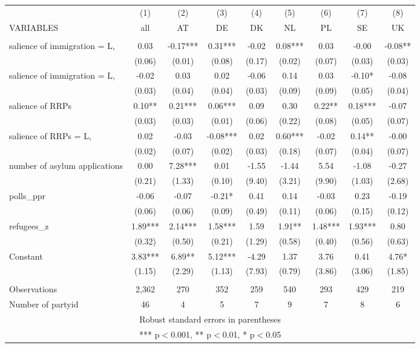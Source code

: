 \documentclass[]{article}
\begin{document}
\begin{tabular}{lcccccccc} \hline
 & (1) & (2) & (3) & (4) & (5) & (6) & (7) & (8) \\
VARIABLES & all & AT & DE & DK & NL & PL & SE & UK \\ \hline
 &  &  &  &  &  &  &  &  \\
salience of immigration = L, & 0.03 & -0.17*** & 0.31*** & -0.02 & 0.08*** & 0.03 & -0.00 & -0.08** \\
 & (0.06) & (0.01) & (0.08) & (0.17) & (0.02) & (0.07) & (0.03) & (0.03) \\
salience of immigration = L, & -0.02 & 0.03 & 0.02 & -0.06 & 0.14 & 0.03 & -0.10* & -0.08 \\
 & (0.03) & (0.04) & (0.04) & (0.03) & (0.09) & (0.09) & (0.05) & (0.04) \\
salience of RRPs & 0.10** & 0.21*** & 0.06*** & 0.09 & 0.30 & 0.22** & 0.18*** & -0.07 \\
 & (0.03) & (0.03) & (0.01) & (0.06) & (0.22) & (0.08) & (0.05) & (0.07) \\
salience of RRPs = L, & 0.02 & -0.03 & -0.08*** & 0.02 & 0.60*** & -0.02 & 0.14** & -0.00 \\
 & (0.02) & (0.07) & (0.02) & (0.03) & (0.18) & (0.07) & (0.04) & (0.07) \\
number of asylum applications & 0.00 & 7.28*** & 0.01 & -1.55 & -1.44 & 5.54 & -1.08 & -0.27 \\
 & (0.21) & (1.33) & (0.10) & (9.40) & (3.21) & (9.90) & (1.03) & (2.68) \\
polls\_ppr & -0.06 & -0.07 & -0.21* & 0.41 & 0.14 & -0.03 & 0.23 & -0.19 \\
 & (0.06) & (0.06) & (0.09) & (0.49) & (0.11) & (0.06) & (0.15) & (0.12) \\
refugees\_z & 1.89*** & 2.14*** & 1.58*** & 1.59 & 1.91** & 1.48*** & 1.93*** & 0.80 \\
 & (0.32) & (0.50) & (0.21) & (1.29) & (0.58) & (0.40) & (0.56) & (0.63) \\
Constant & 3.83*** & 6.89** & 5.12*** & -4.29 & 1.37 & 3.76 & 0.41 & 4.76* \\
 & (1.15) & (2.29) & (1.13) & (7.93) & (0.79) & (3.86) & (3.06) & (1.85) \\
 &  &  &  &  &  &  &  &  \\
Observations & 2,362 & 270 & 352 & 259 & 540 & 293 & 429 & 219 \\
 Number of partyid & 46 & 4 & 5 & 7 & 9 & 7 & 8 & 6 \\ \hline
\multicolumn{9}{c}{ Robust standard errors in parentheses} \\
\multicolumn{9}{c}{ *** p$<$0.001, ** p$<$0.01, * p$<$0.05} \\
\end{tabular}
\end{document}

